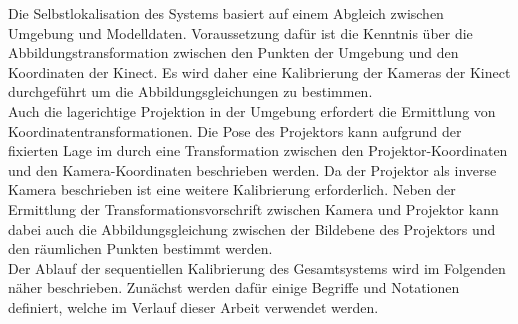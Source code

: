 Die Selbstlokalisation des Systems basiert auf einem Abgleich zwischen Umgebung und Modelldaten. Voraussetzung dafür ist die Kenntnis über die Abbildungstransformation zwischen den Punkten der Umgebung und den Koordinaten der Kinect. Es wird daher eine Kalibrierung der Kameras der Kinect durchgeführt um die Abbildungsgleichungen zu bestimmen.\\

Auch die lagerichtige Projektion in der Umgebung erfordert die Ermittlung von Koordinatentransformationen. Die Pose des Projektors kann aufgrund der fixierten Lage im \kps{} durch eine Transformation zwischen den Projektor-Koordinaten und den Kamera-Koordinaten beschrieben werden. Da der Projektor als inverse Kamera beschrieben ist eine weitere Kalibrierung erforderlich. Neben der Ermittlung der Transformationsvorschrift zwischen Kamera und Projektor kann dabei auch die Abbildungsgleichung zwischen der Bildebene des Projektors und den räumlichen Punkten bestimmt werden.\\
Der Ablauf der sequentiellen Kalibrierung des Gesamtsystems wird im Folgenden näher beschrieben. Zunächst werden dafür einige Begriffe und Notationen definiert, welche im Verlauf dieser Arbeit verwendet werden.\\



